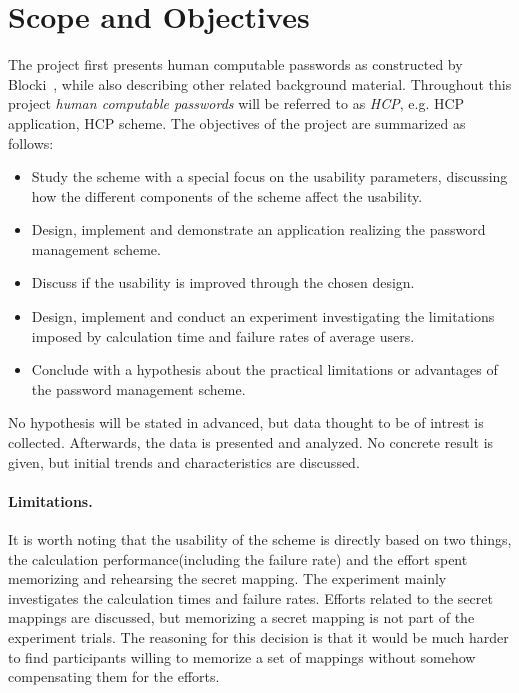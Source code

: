 
\section{Scope and Objectives}
The project first presents human computable passwords as constructed by Blocki~\cite{hcp-blocki}, while also describing other related background material. Throughout this project \emph{human computable passwords} will be referred to as \emph{HCP}, e.g. HCP application, HCP scheme. The objectives of the project are summarized as follows:
\begin{itemize}
    \item Study the scheme with a special focus on the usability parameters, discussing how the different components of the scheme affect the usability.
    \item Design, implement and demonstrate an application realizing the password management scheme.
    \item Discuss if the usability is improved through the chosen design. 
    \item Design, implement and conduct an experiment investigating the limitations imposed by calculation time and failure rates of average users.
    \item Conclude with a hypothesis about the practical limitations or advantages of the password management scheme.
\end{itemize}

\par No hypothesis will be stated in advanced, but data thought to be of intrest is collected. Afterwards, the data is presented and analyzed. No concrete result is given, but initial trends and characteristics are discussed.
\paragraph{Limitations.}
It is worth noting that the usability of the scheme is directly based on two things, the calculation performance(including the failure rate) and the effort spent memorizing and rehearsing the secret mapping. The experiment mainly investigates the calculation times and failure rates. Efforts related to the secret mappings are discussed, but memorizing a secret mapping is not part of the experiment trials. The reasoning for this decision is that it would be much harder to find participants willing to memorize a set of mappings without somehow compensating them for the efforts.



